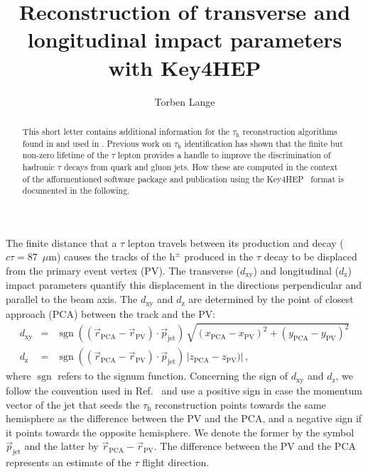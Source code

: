 \documentclass[a4paper,english,11pt]{article}
\newcommand{\Pgt}{\ensuremath{\tau}\xspace}
\newcommand{\tauh}{\ensuremath{\Pgt_{\textrm{h}}}\xspace}
\newcommand{\hpm}{\ensuremath{\textrm{h}^{\pm}}\xspace}
\newcommand{\jet}{\ensuremath{\textrm{jet}}\xspace}
\newcommand{\PCA}{\ensuremath{\textrm{PCA}}\xspace}
\newcommand{\PV}{\ensuremath{\textrm{PV}}\xspace}
\newcommand{\dxy}{\ensuremath{d_{\textrm{xy}}}\xspace}
\newcommand{\dz}{\ensuremath{d_{\textrm{z}}}\xspace}
\DeclareMathOperator{\sign}{sgn}
\begin{document}
	\title{Reconstruction of transverse and longitudinal impact parameters with Key4HEP}
	\author[1]{Torben Lange}
	\maketitle
	\begin{abstract}
		This short letter contains additional information for the $\tauh$ reconstruction algorithms found in \cite{christian_veelken_2023_8113344} and used in \cite{Lange:2023gbe}.
		Previous work on $\tauh$ identification has shown that the finite but non-zero lifetime of the $\Pgt$ lepton provides a handle to improve the discrimination of hadronic $\Pgt$ decays from quark and gluon jets. How these are computed in the context of the afformentioned software package and publication using the Key4HEP~\cite{Ganis:2021vgv} format is documented in the following.
	\end{abstract}

	The finite distance that a $\Pgt$ lepton travels between its production and decay ($c\tau = 87$~$\mu$m) causes the tracks of the $\hpm$ produced in the $\Pgt$ decay to be displaced from the primary event vertex (PV).
	The transverse ($\dxy$) and longitudinal ($\dz$) impact parameters quantify this displacement in the directions perpendicular and parallel to the beam axis.
	The $\dxy$ and $\dz$ are determined by the point of closest approach (PCA) between the track and the PV:
	\begin{eqnarray}
		\dxy & = & \sign\left(\left( \vec{r}_{\PCA} - \vec{r}_{\PV} \right) \cdot \vec{p}_{\jet}\right) \, \sqrt{ (x_{\PCA} - x_{\PV})^{2} + (y_{\PCA} - y_{\PV})^{2}} \nonumber \\
		\dz & = & \sign\left(\left( \vec{r}_{\PCA} - \vec{r}_{\PV} \right) \cdot \vec{p}_{\jet}\right) \, \vert z_{\PCA} - z_{\PV}) \vert \, ,
		\label{eq:ImpactParameters}
	\end{eqnarray}
	where $\sign$ refers to the signum function.
	Concerning the sign of $\dxy$ and $\dz$, we follow the convention used in Ref.~\cite{CMS:2011hta} and use a positive sign in case the momentum vector of the jet that seeds the $\tauh$ reconstruction points towards the same hemisphere as the difference between the PV and the PCA, and a negative sign if it points towards the opposite hemisphere.
	We denote the former by the symbol $\vec{p}_{\jet}$ and the latter by $\vec{r}_{\PCA} - \vec{r}_{\PV}$.
	The difference between the PV and the PCA represents an estimate of the $\Pgt$ flight direction.
\end{document}
